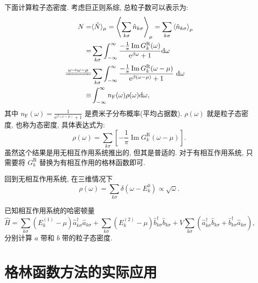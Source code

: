 下面计算粒子态密度. 考虑巨正则系综, 总粒子数可以表示为:
\begin{align}
N= &\langle\hat{N}\rangle_{\mu}=\left\langle\sum_{k  \sigma} \hat{n}_{k  \sigma}\right\rangle_{\mu}=\sum_{k  \sigma}\left\langle\hat{n}_{k  \sigma}\right\rangle_{\mu} \nonumber\\
=&\sum_{k  \sigma} \int_{-\infty}^{\infty} \frac{-\frac{1}{\pi} \operatorname{Im} G^{\mathrm{R}}_{k }(\omega)}{\mathrm{e}^{\beta \omega}+1} \mathrm{d} \omega\nonumber \\
\xlongequal[]{\omega \rightarrow \omega-\mu}& \sum_{k  \sigma} \int_{-\infty}^{\infty} \frac{-\frac{1}{\pi} \operatorname{Im} G^{\mathrm{R}}_{k }(\omega-\mu)}{\mathrm{e}^{\beta(\omega-\mu)}+1} \mathrm{~d} \omega\nonumber \\
\equiv&\int_{-\infty}^{\infty} n_{\mathrm{F}}(\omega) \rho(\omega) \mathrm{d} \omega ,
\end{align}
其中 $\displaystyle n_{\mathrm{F}}(\omega)=\frac{1}{\mathrm{e}^{\beta (\omega-\mu)}+1}$ 是费米子分布概率(平均占据数). $\rho(\omega)$ 就是粒子态密度, 也称为态密度, 具体表达式为:
\begin{equation}
\rho(\omega) =\sum_{k  \sigma}\left[-\frac{1}{\pi} \operatorname{Im} G^{\mathrm{R}}_{k }(\omega-\mu)\right] .
\end{equation}
虽然这个结果是用无相互作用系统推出的, 但其是普适的. 对于有相互作用系统, 只需要将 $G^{\mathrm{R}}_{k }$ 替换为有相互作用的格林函数即可.

回到无相互作用系统, 在三维情况下 
\begin{equation}
\rho(\omega) =\sum_{k  \sigma} \delta\left(\omega-E_{k}^0 \right)\propto \sqrt{\omega}.
\end{equation}

\begin{question}{}{}
已知相互作用系统的哈密顿量
\begin{equation}
\hat{H}=\sum_{k  \sigma} (E_{k}^{(1)}-\mu) \hat{a}_{k  \sigma}^{\dagger} \hat{a}_{k  \sigma}^{}+\sum_{k  \sigma} (E_{k}^{(2)}-\mu) \hat{b}_{k  \sigma}^{\dagger} \hat{b}_{k  \sigma}^{}+V\sum_{k  \sigma} \left(\hat{a}_{k  \sigma}^{\dagger} \hat{b}_{k  \sigma}^{}+\hat{b}_{k  \sigma}^{\dagger} \hat{a}_{k  \sigma}^{}\right),
\end{equation}
分别计算 $a$ 带和 $b$ 带的粒子态密度.
\end{question}

\section{格林函数方法的实际应用}
